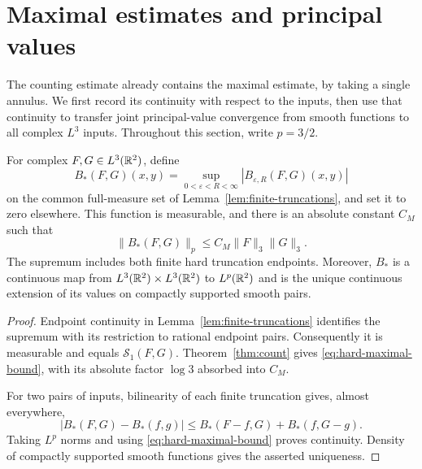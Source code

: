 \section{Maximal estimates and principal values}\label{sec:consequences}

The counting estimate already contains the maximal estimate, by taking
a single annulus. We first record its continuity with respect to the
inputs, then use that continuity to transfer joint principal-value
convergence from smooth functions to all complex $L^3$ inputs.
Throughout this section, write $p=3/2$.

\begin{corollary}\label{cor:maximal}
For complex $F,G\in L^3(\mathbb R^2)$, define
\[
 B_*(F,G)(x,y)
 =\sup_{0<\varepsilon<R<\infty}|B_{\varepsilon,R}(F,G)(x,y)|
\]
on the common full-measure set of Lemma~\ref{lem:finite-truncations},
and set it to zero elsewhere. This function is measurable, and there is
an absolute constant $C_M$ such that
\begin{equation}\label{eq:hard-maximal-bound}
 \|B_*(F,G)\|_p\le C_M\|F\|_3\|G\|_3.
\end{equation}
The supremum includes both finite hard truncation endpoints. Moreover,
$B_*$ is a continuous map from $L^3(\mathbb R^2)\times L^3(\mathbb R^2)$ to
$L^p(\mathbb R^2)$ and is the unique continuous extension of its values on
compactly supported smooth pairs.
\end{corollary}

\begin{proof}
Endpoint continuity in Lemma~\ref{lem:finite-truncations} identifies the
supremum with its restriction to rational endpoint pairs. Consequently
it is measurable and equals $\mathcal S_1(F,G)$. Theorem~\ref{thm:count}
gives \eqref{eq:hard-maximal-bound}, with its absolute factor
$\log 3$ absorbed into $C_M$.

For two pairs of inputs, bilinearity of each finite truncation gives,
almost everywhere,
\begin{equation}\label{eq:maximal-continuity}
 |B_*(F,G)-B_*(f,g)|
 \le B_*(F-f,G)+B_*(f,G-g).
\end{equation}
Taking $L^p$ norms and using \eqref{eq:hard-maximal-bound} proves
continuity. Density of compactly supported smooth functions gives the
asserted uniqueness.
\end{proof}

